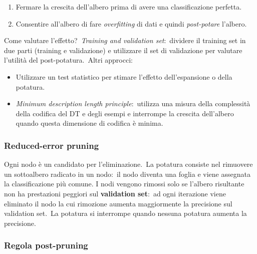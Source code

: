 \begin{enumerate}
	\item Fermare la crescita dell'albero prima di avere una classificazione perfetta.
	\item Consentire all'albero di fare \textit{overfitting} di dati e quindi \textit{post-potare} l'albero.
\end{enumerate}

\noindent Come valutare l'effetto?\
\textit{Training and validation set}:\ dividere il training set in due parti (training e validazione) e utilizzare il set di validazione per valutare l'utilità del post-potatura.\
Altri approcci:
\begin{itemize}
	\item Utilizzare un test statistico per stimare l'effetto dell'espansione o della potatura.
	\item \textit{Minimum description length principle}:\ utilizza una misura della complessità della codifica del DT e degli esempi e interrompe la crescita dell'albero quando questa dimensione di codifica è minima.
\end{itemize}

\subsubsection{Reduced-error pruning}

Ogni nodo è un candidato per l'eliminazione.\
La potatura consiste nel rimuovere un sottoalbero radicato in un nodo:\ il nodo diventa una foglia e viene assegnata la classificazione più comune.
I nodi vengono rimossi solo se l'albero risultante non ha prestazioni peggiori sul \textbf{validation set}:\ ad ogni iterazione viene eliminato il nodo la cui rimozione aumenta maggiormente la precisione sul validation set.\
La potatura si interrompe quando nessuna potatura aumenta la precisione.\

\subsubsection{Regola post-pruning}

